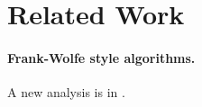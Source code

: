 \section{Related Work}


\paragraph{Frank-Wolfe style algorithms.}

A new analysis is in \citet{freund2016new}.


